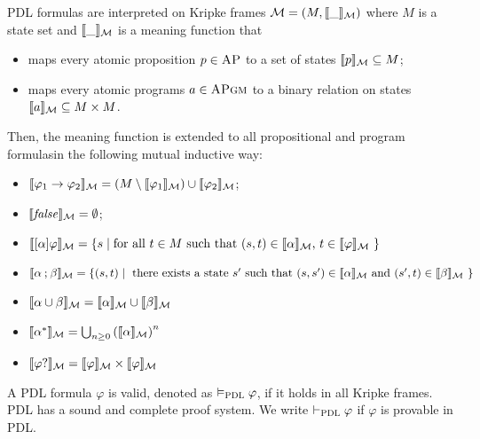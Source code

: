 \documentclass{amsart}
\begin{document}
PDL formulas are interpreted on Kripke frames
$\mathcal{M} = (M,{\llbracket\_\rrbracket_{\mathcal{M}}})$ where $M$ is a state set and 
${\llbracket\_\rrbracket_{\mathcal{M}}}$ is a meaning function that
\begin{itemize}
	\item maps every atomic proposition $p \in \textsc{AP}$ to a set of states ${\llbracket p\rrbracket_{\mathcal{M}}}
	\subseteq M$;
	\item maps every atomic programs $a \in \textsc{APgm}$ to a binary relation on states
	${\llbracket a\rrbracket_{\mathcal{M}}} \subseteq M \times M$.
\end{itemize}
Then, the meaning function is extended to all propositional and program formulasin the following mutual inductive way:
\begin{itemize}
	\item ${\llbracket\varphi_1 \to \varphi_2\rrbracket_{\mathcal{M}}} = 
	(M \setminus {\llbracket\varphi_1\rrbracket_{\mathcal{M}}}) \cup {\llbracket\varphi_2\rrbracket_{\mathcal{M}}}$;
	\item ${\llbracket\mathit{false}\rrbracket_{\mathcal{M}}} = \emptyset$;
	\item ${\llbracket[\alpha] \varphi\rrbracket_{\mathcal{M}}}
	= \{ s \mid \text{for all $t \in M$ such that $(s,t) \in {\llbracket\alpha\rrbracket_{\mathcal{M}}}$,                         $t \in {\llbracket\varphi\rrbracket_{\mathcal{M}}}$ } \}$
	\item ${\llbracket\alpha \mathbin{;} \beta\rrbracket_{\mathcal{M}}} =
	\{ (s,t) \mid \text{
		there exists a state $s'$ such that
		$(s,s') \in {\llbracket\alpha\rrbracket_{\mathcal{M}}}$ and $(s',t) \in {\llbracket\beta\rrbracket_{\mathcal{M}}}$
	} \}$
	\item ${\llbracket\alpha \mathbin{\cup} \beta\rrbracket_{\mathcal{M}}} =
	{\llbracket\alpha\rrbracket_{\mathcal{M}}} \cup {\llbracket\beta\rrbracket_{\mathcal{M}}}$
	\item ${\llbracket\alpha ^*\rrbracket_{\mathcal{M}}} =
	\bigcup_{n \ge 0} \left({\llbracket\alpha\rrbracket_{\mathcal{M}}}\right)^n$
	\item ${\llbracket\varphi{?}\rrbracket_{\mathcal{M}}} = {\llbracket\varphi\rrbracket_{\mathcal{M}}} \times
	{\llbracket\varphi\rrbracket_{\mathcal{M}}}$
\end{itemize}
A PDL formula $\varphi$ is valid, denoted as $\vDash_{\textsc{PDL}} \varphi$,
if it holds in all Kripke frames.
PDL has a sound and complete proof system.
We write $\vdash_{\textsc{PDL}} \varphi$ if $\varphi$ is provable in PDL.
\end{document}
